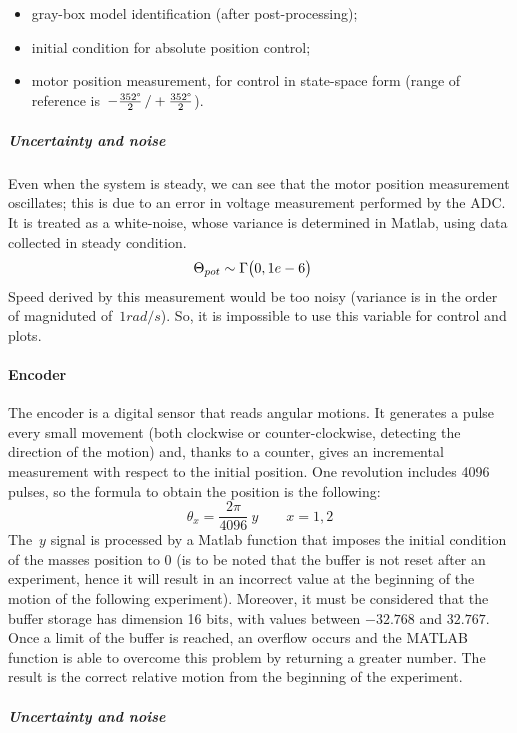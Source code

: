 \begin{itemize}
	\item gray-box model identification (after post-processing);
	\item initial condition for absolute position control;
	\item motor position measurement, for control in state-space form (range of reference is~$-\frac{352 \degree}{2} \, / +\frac{352 \degree}{2}$).
\end{itemize}

\subparagraph{Uncertainty and noise}
Even when the system is steady, we can see that the motor position measurement oscillates; this is due to an error in voltage measurement performed by the ADC. It is treated as a white-noise, whose variance is determined in Matlab, using data collected in steady condition.
\begin{align*}
	\Theta_{pot} &\sim \Gamma \bigl{(} 0, 1e-6 \bigr{)}
\end{align*}
Speed derived by this measurement would be too noisy (variance is in the order of magniduted of~$1 rad/s$). So, it is impossible to use this variable for control and plots.

\paragraph{Encoder}

The encoder is a digital sensor that reads angular motions. It generates a pulse every small movement (both clockwise or counter-clockwise, detecting the direction of the motion) and, thanks to a counter, gives an incremental measurement with respect to the initial position. One revolution includes 4096 pulses, so the formula to obtain the position is the following:
\[
	\theta_x = \frac{2\pi}{4096} \ y \qquad x={1,2}
\]
The~$y$ signal is processed by a Matlab function that imposes the initial condition of the masses position to 0 (is to be noted that the buffer is not reset after an experiment, hence it will result in an incorrect value at the beginning of the motion of the following experiment). Moreover, it must be considered that the buffer storage has dimension 16 bits, with values between $-32.768$ and $32.767$. Once a limit of the buffer is reached, an overflow occurs and the MATLAB function is able to overcome this problem by returning a greater number. The result is the correct relative motion from the beginning of the experiment.

\subparagraph{Uncertainty and noise}

